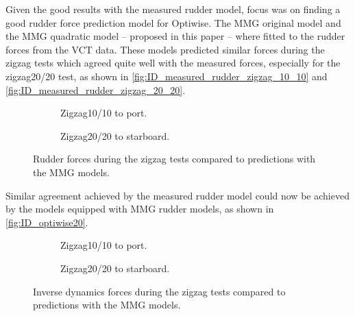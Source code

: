 Given the good results with the measured rudder model, focus was on finding a good rudder force prediction model for Optiwise. The MMG original model and the MMG quadratic model -- proposed in this paper -- where fitted to the rudder forces from the VCT data. These models predicted similar forces during the zigzag tests which agreed quite well with the measured forces, especially for the zigzag20/20 test, as shown in \autoref{fig:ID_measured_rudder_zigzag_10_10} and \autoref{fig:ID_measured_rudder_zigzag_20_20}.
\begin{figure}[h]
    \centering
    \begin{subfigure}[b]{\textwidth}
        \centering
        
        \caption{Zigzag10/10 to port.}
        \label{fig:ID_measured_rudder_zigzag_10_10}
    \end{subfigure}
     \vfill
    \begin{subfigure}[b]{\textwidth}
        \centering
        
        \caption{Zigzag20/20 to starboard.}
        \label{fig:ID_measured_rudder_zigzag_20_20}
    \end{subfigure}
    \caption{Rudder forces during the zigzag tests compared to predictions with the MMG models.}
    \label{fig:ID_optiwise20}
\end{figure}

Similar agreement achieved by the measured rudder model could now be achieved by the models equipped with MMG rudder models, as shown in \autoref{fig:ID_optiwise20}.
\begin{figure}[h]
    \centering
    \begin{subfigure}[b]{\textwidth}
        \centering
        
        \caption{Zigzag10/10 to port.}
        \label{fig:ID_measured_rudder_zigzag_10_10}
    \end{subfigure}
     \vfill
    \begin{subfigure}[b]{\textwidth}
        \centering
        
        \caption{Zigzag20/20 to starboard.}
        \label{fig:ID_measured_rudder_zigzag_20_20}
    \end{subfigure}
    \caption{Inverse dynamics forces during the zigzag tests compared to predictions with the MMG models.}
    \label{fig:ID_optiwise20}
\end{figure}


